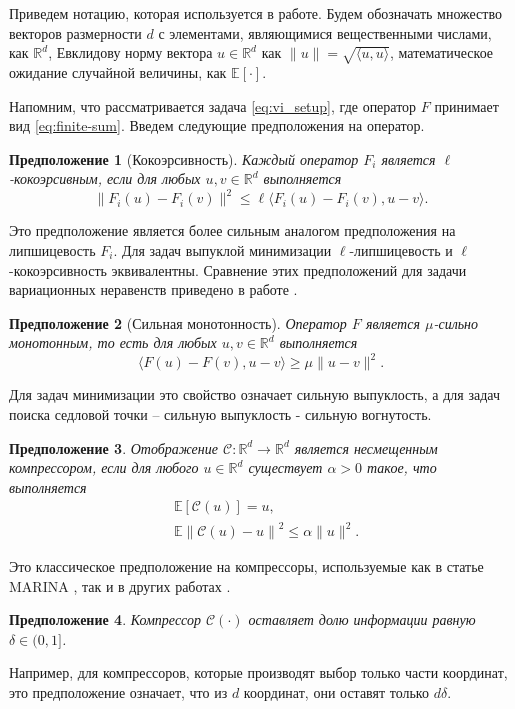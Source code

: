 \documentclass{ProcISPRAS}
\newtheorem{assumption}{Предположение}
\begin{document}
Приведем нотацию, которая используется в работе. Будем обозначать множество векторов размерности $d$ с элементами, являющимися вещественными числами, как $\mathbb R^d$, Евклидову норму вектора $u\in\mathbb R^d$ как $\|u\| = \sqrt{\langle u, u\rangle}$, математическое ожидание случайной величины, как $\mathbb E[\cdot]$.

Напомним, что рассматривается задача \eqref{eq:vi_setup}, где оператор $F$ принимает вид \eqref{eq:finite-sum}. Введем следующие предположения на оператор.

\begin{assumption}[Кокоэрсивность] \label{as:coerc}
Каждый оператор $F_i$ является $\ell$-кокоэрсивным, если для любых $u, v \in \mathbb R^d$ выполняется
\begin{equation*}
\label{eq:Lipsh}
\| F_i(u)-F_i(v) \|^2  \leq \ell \langle F_i(u)-F_i(v) , u - v\rangle.
\end{equation*}
\end{assumption}
Это предположение является более сильным аналогом предположения на липшицевость $F_i$. Для задач выпуклой минимизации $\ell$-липшицевость и $\ell$-кокоэрсивность эквивалентны. Сравнение этих предположений для задачи вариационных неравенств приведено в работе \cite{loizou2021stochastic}.

\begin{assumption}[Сильная монотонность]\label{as:strmon}
Оператор $F$ является $\mu$-сильно монотонным, то есть для любых $u, v \in \mathbb R^d$ выполняется
\begin{equation*}
\label{eq:strmon}
\langle F(u) - F(v), u - v \rangle \geq \mu \| u-v\|^2.
\end{equation*}
\end{assumption}
Для задач минимизации это свойство означает сильную выпуклость, а для задач поиска седловой точки -- сильную выпуклость - сильную вогнутость.
\begin{assumption}\label{as:bias}
    Отображение $\mathcal{C}: \mathbb R^d \rightarrow \mathbb R^d$ является несмещенным компрессором, если для любого $u\in\mathbb R^d$ существует $\alpha > 0$ такое, что выполняется
    \begin{align*}
        &\mathbb E\left[\mathcal{C}(u)\right] = u,\\
        &\mathbb E\left\|\mathcal{C}(u) - u\right\|^2 \leqslant \alpha \|u\|^2.
    \end{align*}
\end{assumption}
Это классическое предположение на компрессоры, используемые как в статье \textsc{MARINA} \cite{gorbunov2021marina}, так и в других работах \cite{alistarh2017qsgd, gorbunov2020unified}.
\begin{assumption}\label{as:comp}
    Компрессор $\mathcal{C}(\cdot)$ оставляет долю информации равную $\delta \in (0, 1]$.
\end{assumption}
Например, для компрессоров, которые производят выбор только части координат, это предположение означает, что из $d$ координат, они оставят только $d\delta$.
\end{document}
